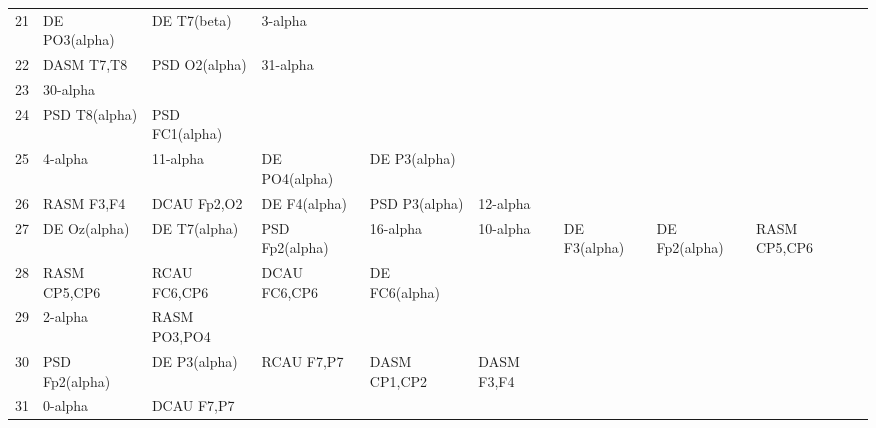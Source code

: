 \begin{landscape}
\begin{table}[]
\begin{tabular}{l|llllllll}
21       & DE PO3(alpha)  & DE T7(beta)    & 3-alpha        &                &                &                &                &                &               &              \\
22       & DASM T7,T8     & PSD O2(alpha)  & 31-alpha       &                &                &                &                &                &               &              \\
23       & 30-alpha       &                &                &                &                &                &                &                &               &              \\
24       & PSD T8(alpha)  & PSD FC1(alpha) &                &                &                &                &                &                &               &              \\
25       & 4-alpha        & 11-alpha       & DE PO4(alpha)  & DE P3(alpha)   &                &                &                &                &               &              \\
26       & RASM F3,F4     & DCAU Fp2,O2    & DE F4(alpha)   & PSD P3(alpha)  & 12-alpha       &                &                &                &               &              \\
27       & DE Oz(alpha)   & DE T7(alpha)   & PSD Fp2(alpha) & 16-alpha       & 10-alpha       & DE F3(alpha)   & DE Fp2(alpha)  & RASM CP5,CP6   &               &              \\
28       & RASM CP5,CP6   & RCAU FC6,CP6   & DCAU FC6,CP6   & DE FC6(alpha)  &                &                &                &                &               &              \\
29       & 2-alpha        & RASM PO3,PO4   &                &                &                &                &                &                &               &              \\
30       & PSD Fp2(alpha) & DE P3(alpha)   & RCAU F7,P7     & DASM CP1,CP2   & DASM F3,F4     &                &                &                &               &              \\
31       & 0-alpha        & DCAU F7,P7     &                &                &                &                &                &                &               &              \\
\end{tabular}
\end{table}
\end{landscape}
\clearpage
